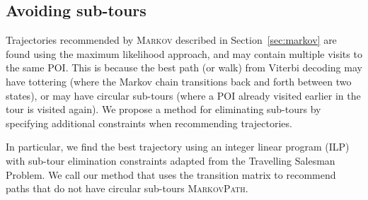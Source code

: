 \subsection{Avoiding sub-tours} %
\label{sec:nosubtour}

Trajectories recommended by \textsc{Markov} described in Section~\ref{sec:markov} are found
using the maximum likelihood approach, and may contain multiple visits to the same POI.
This is because the best path (or walk) from Viterbi decoding %
may have tottering (where the Markov chain transitions back and forth between two states),
or may have circular sub-tours (where a POI already visited earlier in the tour is visited again).
We propose a method for eliminating sub-tours by specifying additional constraints when recommending trajectories.

In particular, we find the best trajectory using an integer linear program (ILP) with
sub-tour elimination constraints adapted from the Travelling Salesman Problem. %
We call our method that uses the transition matrix to recommend paths that do not have circular sub-tours \textsc{MarkovPath}.

